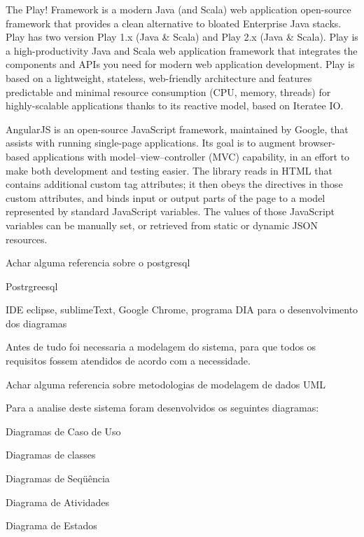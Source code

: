 \documentclass{abntpuc}
\begin{document}
	The Play! Framework is a modern Java (and Scala) web application open-source framework that provides a clean alternative to bloated Enterprise Java stacks. Play has two version Play 1.x (Java & Scala) and Play 2.x (Java & Scala).
	Play is a high-productivity Java and Scala web application framework that integrates the components and APIs you need for modern web application development.
	Play is based on a lightweight, stateless, web-friendly architecture and features predictable and minimal resource consumption (CPU, memory, threads) for highly-scalable applications thanks to its reactive model, based on Iteratee IO.\par

	AngularJS is an open-source JavaScript framework, maintained by Google, that assists with running single-page applications. Its goal is to augment browser-based applications with model–view–controller (MVC) capability, in an effort to make both development and testing easier.
	The library reads in HTML that contains additional custom tag attributes; it then obeys the directives in those custom attributes, and binds input or output parts of the page to a model represented by standard JavaScript variables. The values of those JavaScript variables can be manually set, or retrieved from static or dynamic JSON resources.\par


	Achar alguma referencia sobre o postgresql\par
	Postrgreesql


	IDE eclipse, sublimeText, Google Chrome, programa DIA para o desenvolvimento dos diagramas


	Antes de tudo foi necessaria a modelagem do sistema, para que todos os requisitos fossem atendidos de acordo com a necessidade.\par

	Achar alguma referencia sobre metodologias de modelagem de dados UML\par

	Para a analise deste sistema foram desenvolvidos os seguintes diagramas:\par
	
	Diagramas de Caso de Uso\par
	Diagramas de classes\par
	Diagramas de Seqüência\par
	Diagrama de Atividades\par
	Diagrama de Estados\par
\end{document}
